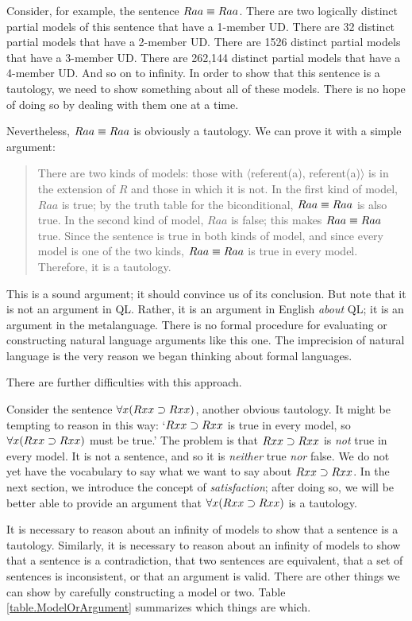 Consider, for example, the sentence $Raa\equiv Raa$. There are two logically distinct partial models of this sentence that have a 1-member UD. There are 32 distinct partial models that have a 2-member UD. There are 1526 distinct partial models that have a 3-member UD. There are 262,144 distinct partial models that have a 4-member UD. And so on to infinity. In order to show that this sentence is a tautology, we need to show something about all of these models. There is no hope of doing so by dealing with them one at a time.

Nevertheless, $Raa\equiv Raa$ is obviously a tautology. We can prove it with a simple argument:
\begin{quote}
\label{allmodels1}
There are two kinds of models: those with $\langle$referent(a), referent(a)$\rangle$ is in the extension of $R$ and those in which it is not. In the first kind of model, $Raa$ is true; by the truth table for the biconditional, $Raa\equiv Raa$ is also true. In the second kind of model, $Raa$ is false; this makes $Raa\equiv Raa$ true. Since the sentence is true in both kinds of model, and since every model is one of the two kinds, $Raa\equiv Raa$ is true in every model. Therefore, it is a tautology.
\end{quote}
This is a sound argument; it should convince us of its conclusion. But note that it is not an argument in QL. Rather, it is an argument in English \emph{about} QL; it is an argument in the metalanguage. There is no formal procedure for evaluating or constructing natural language arguments like this one. The imprecision of natural language is the very reason we began thinking about formal languages.

There are further difficulties with this approach.

Consider the sentence $\forall x(Rxx\supset Rxx)$, another obvious tautology. It might be tempting to reason in this way: `$Rxx\supset Rxx$ is true in every model, so $\forall x(Rxx\supset Rxx)$ must be true.' The problem is that $Rxx\supset Rxx$ is \emph{not} true in every model. It is not a sentence, and so it is \emph{neither} true \emph{nor} false. We do not yet have the vocabulary to say what we want to say about $Rxx\supset Rxx$. In the next section, we introduce the concept of \emph{satisfaction}; after doing so, we will be better able to provide an argument that $\forall x(Rxx\supset Rxx)$ is a tautology.

It is necessary to reason about an infinity of models to show that a sentence is a tautology. Similarly, it is necessary to reason about an infinity of models to show that a sentence is a contradiction, that two sentences are equivalent, that a set of sentences is inconsistent, or that an argument is valid. There are other things we can show by carefully constructing a model or two. Table \ref{table.ModelOrArgument} summarizes which things are which.






